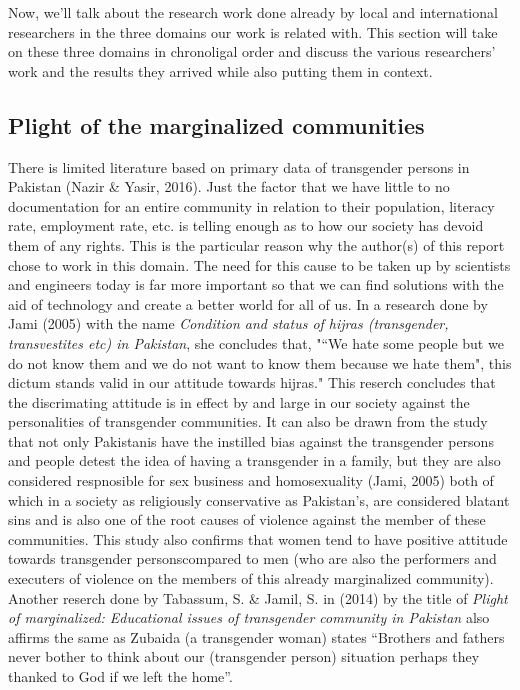 Now, we'll talk about the research work done already by local and international researchers in the three domains our work is related with. This section will take on these three domains in chronoligal order and discuss the various researchers' work  and the results they arrived while also putting them in context.

\subsection{Plight of the marginalized communities}

There is limited literature based on primary data of transgender persons in Pakistan (Nazir \& Yasir, 2016). Just the factor that we have little to no documentation for an entire community in relation to their population, literacy rate, employment rate, etc. is telling enough as to how our society has devoid them of any rights. This is the particular reason why the author(s) of this report chose to work in this domain. The need for this cause to be taken up by scientists and engineers today is far more important so that we can find solutions with the aid of technology and create a better world for all of us. In a research done by Jami (2005) with the name \textit {Condition and status of hijras (transgender, transvestites etc) in Pakistan}, she concludes that, "“We hate some people but we do not know them and we do not want to know them because we hate them", this dictum stands valid in our attitude towards hijras." This reserch concludes that the discrimating attitude is in effect by and large in our society against the personalities of transgender communities. It can also be drawn from the study that not only Pakistanis have the instilled bias against the transgender persons and people detest the idea of having a transgender in a family, but they are also considered respnosible for sex business and homosexuality (Jami, 2005) both of which in a society as religiously conservative as Pakistan's, are considered blatant sins and is also one of the root causes of violence against the member of these communities. This study also confirms that women tend to have positive attitude towards transgender personscompared to men (who are also the performers and executers of violence on the members of this already marginalized community). Another reserch done by Tabassum, S. \& Jamil, S. in (2014) by the title of \textit {Plight of marginalized: Educational issues of transgender community in Pakistan} also affirms the same as Zubaida (a transgender woman) states “Brothers and fathers never bother to think about our (transgender person) situation perhaps they thanked to God if we left the home”. 



